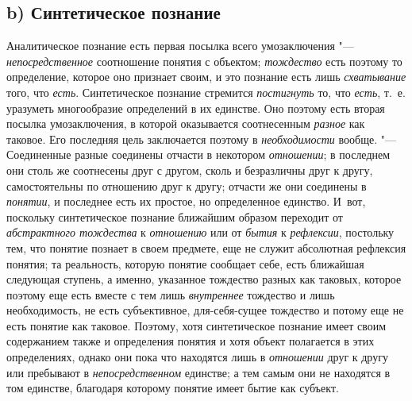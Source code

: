 \subsection[b) Синтетическое познание]{b) Синтетическое познание}
Аналитическое познание есть первая посылка всего
умозаключения "--- {\em непосредственное}
соотношение понятия с объектом;
{\em тождество} есть
поэтому то определение, которое оно признает своим, и это познание есть
лишь {\em схватывание}
того, что {\em есть}.
Синтетическое познание стремится
{\em постигнуть} то, что
{\em есть}, т.~е.
уразуметь многообразие определений в их единстве. Оно поэтому есть вторая
посылка умозаключения, в
которой
оказывается соотнесенным
{\em разное} как таковое.
Его последняя цель заключается поэтому в
{\em необходимости}
вообще. "--- Соединенные разные соединены отчасти
в некотором {\em отношении};
в последнем они столь же соотнесены друг с другом, сколь и
безразличны друг к другу, самостоятельны по отношению друг к другу; отчасти
же они соединены в {\em понятии},
и последнее есть их простое, но определенное единство. И~вот,
поскольку синтетическое познание ближайшим образом переходит от
{\em абстрактного тождества}
к {\em отношению}
или от {\em бытия}
к {\em рефлексии},
постольку тем, что понятие познает в своем предмете, еще не
служит абсолютная рефлексия понятия; та реальность, которую понятие
сообщает себе, есть ближайшая следующая ступень, а именно, указанное
тождество разных как таковых, которое поэтому еще есть вместе с тем лишь
{\em внутреннее}
тождество и лишь необходимость, не есть субъективное,
для-себя-сущее тождество и потому еще не есть понятие как таковое. Поэтому,
хотя синтетическое познание имеет своим содержанием также и определения
понятия и хотя объект полагается в этих определениях, однако они пока что
находятся лишь в {\em отношении}
друг к другу или пребывают в
{\em непосредственном}
единстве; а тем самым они не находятся в том единстве,
благодаря которому понятие имеет бытие как субъект.

